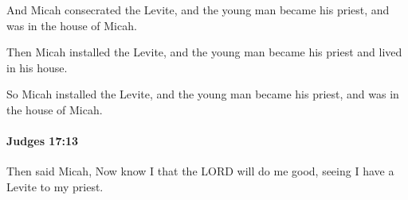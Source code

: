 			\begin{versebox}
					\item[BHS] 
					\item[ASV] And Micah consecrated the Levite, and the young man became his priest, and was in the house of Micah.
					\item[NIV] Then Micah installed the Levite, and the young man became his priest and lived in his house.
					\item[NRSV] So Micah installed the Levite, and the young man became his priest, and was in the house of Micah.
			\end{versebox}

		\paragraph{Judges 17:13} %
			\label{JUDGES-17-13}

			Then said Micah, Now know I that the LORD will do me good, seeing I have a Levite to my priest.

